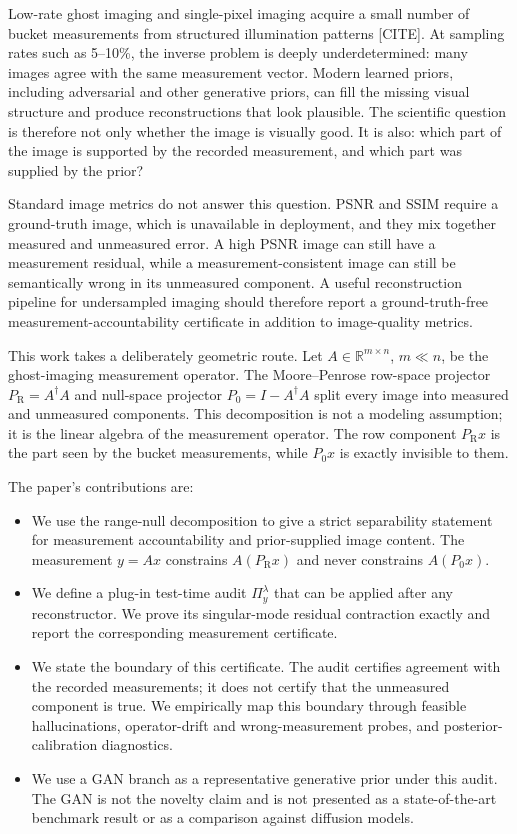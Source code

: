 \documentclass[journal]{IEEEtran}
\newcommand{\R}{\mathbb{R}}
\newcommand{\pinv}{\dagger}
\newcommand{\PR}{P_{\mathrm{R}}}
\newcommand{\PZ}{P_{0}}
\newcommand{\Audit}{\Pi_y^\lambda}
\begin{document}
Low-rate ghost imaging and single-pixel imaging acquire a small number of bucket measurements from structured illumination patterns [CITE].  At sampling rates such as 5--10\%, the inverse problem is deeply underdetermined: many images agree with the same measurement vector.  Modern learned priors, including adversarial and other generative priors, can fill the missing visual structure and produce reconstructions that look plausible.  The scientific question is therefore not only whether the image is visually good.  It is also: which part of the image is supported by the recorded measurement, and which part was supplied by the prior?

Standard image metrics do not answer this question.  PSNR and SSIM require a ground-truth image, which is unavailable in deployment, and they mix together measured and unmeasured error.  A high PSNR image can still have a measurement residual, while a measurement-consistent image can still be semantically wrong in its unmeasured component.  A useful reconstruction pipeline for undersampled imaging should therefore report a ground-truth-free measurement-accountability certificate in addition to image-quality metrics.

This work takes a deliberately geometric route.  Let $A\in\R^{m\times n}$, $m\ll n$, be the ghost-imaging measurement operator.  The Moore--Penrose row-space projector $\PR=A^\pinv A$ and null-space projector $\PZ=I-A^\pinv A$ split every image into measured and unmeasured components.  This decomposition is not a modeling assumption; it is the linear algebra of the measurement operator.  The row component $\PR x$ is the part seen by the bucket measurements, while $\PZ x$ is exactly invisible to them.

The paper's contributions are:

\begin{itemize}
    \item We use the range-null decomposition to give a strict separability statement for measurement accountability and prior-supplied image content.  The measurement $y=Ax$ constrains $A(\PR x)$ and never constrains $A(\PZ x)$.
    \item We define a plug-in test-time audit $\Audit$ that can be applied after any reconstructor.  We prove its singular-mode residual contraction exactly and report the corresponding measurement certificate.
    \item We state the boundary of this certificate.  The audit certifies agreement with the recorded measurements; it does not certify that the unmeasured component is true.  We empirically map this boundary through feasible hallucinations, operator-drift and wrong-measurement probes, and posterior-calibration diagnostics.
    \item We use a GAN branch as a representative generative prior under this audit.  The GAN is not the novelty claim and is not presented as a state-of-the-art benchmark result or as a comparison against diffusion models.
\end{itemize}
\end{document}
